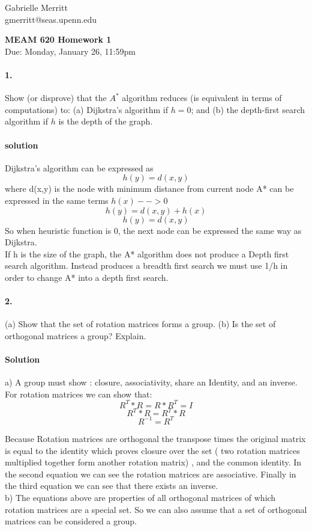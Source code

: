 \documentclass[english]{article}
\begin{document}
Gabrielle Merritt 
\\
gmerritt@seas.upenn.edu 
\begin{center}
{\textbf{MEAM 620 Homework 1}} \\
Due: Monday, January 26, 11:59pm 
\end{center}






\paragraph{1.}

Show (or disprove) that the $A^*$ algorithm reduces (is equivalent in terms of computations) to: 
(a) Dijkstra's algorithm if $h=0$; and (b) the depth-first search algorithm if $h$ is the depth of the graph. 
\paragraph{solution} 
Dijkstra's algorithm can be expressed as 
$$ h(y) = d(x,y) $$ where d(x,y) is the node with minimum distance from current node
A* can be expressed in the same terms 
$h(x) -->0 $
$$ h(y) = d(x,y) + h(x) $$
$$ h(y) = d(x,y) $$ 
So when heuristic function is 0, the next node can be expressed the same way as Dijkstra.
\\ 
If h is the size of the graph, the A* algorithm does not produce a Depth first search algorithm. Instead produces a breadth first search we must use 1/h in order to change A* into a  depth first search. 

\paragraph{2.}

(a) Show that the set of rotation matrices forms a group. (b) Is the set of orthogonal matrices a group? Explain. 
\paragraph{Solution} 
a) A group must show : closure, associativity, share an Identity, and an inverse. For rotation matrices we can show that: 
$$R^T*R = R*R^T = I $$ 
$$R^T*R = R^T*R$$
$$ R^{-1} = R^{T} $$

Because Rotation matrices are orthogonal the transpose times the original matrix is equal to the identity which proves closure over the set ( two rotation matrices multiplied together form another rotation matrix) , and the common identity. In the second equation  we can see the rotation matrices are associative. Finally in the third equation we can see that there exists an inverse. 
\\
b) The equations above are properties of all orthogonal matrices of which rotation matrices are a special set. So we can also assume that a set of orthogonal matrices can be considered a group. 
\end{document}
